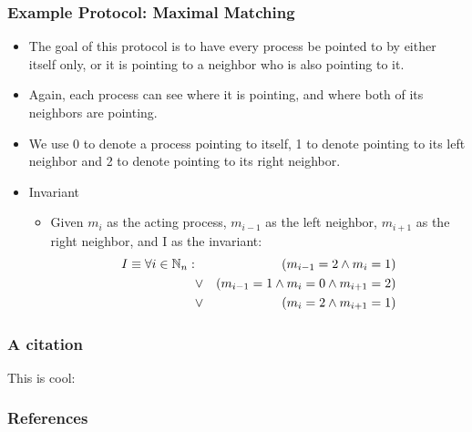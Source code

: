 \documentclass[handout]{beamer}
\begin{document}
\begin{frame}
\frametitle{Example Protocol: Maximal Matching}
\begin{itemize}
\item The goal of this protocol is to have every process be pointed to by either itself only, or it
    is pointing to a neighbor who is also pointing to it.
\item Again, each process can see where it is pointing, and where both of its neighbors are
    pointing.
\item We use 0 to denote a process pointing to itself, 1 to denote pointing to its left neighbor
    and 2 to denote pointing to its right neighbor.
\item Invariant
 \begin{itemize}
 \item Given $m_i$ as the acting process, $m_{i-1}$ as the left neighbor, $m_{i+1}$ as the right
    neighbor, and I as the invariant:
  \begin{eqnarray*}
   I \equiv \forall i\in\mathbb{N}_n: & & (m_{i-1} = 2 \wedge m_i = 1)
                    \\ & \vee  & (m_{i-1} = 1 \wedge m_i = 0 \wedge m_{i+1} = 2)
                    \\ & \vee  & (m_i = 2 \wedge m_{i+1} = 1)
  \end{eqnarray*}
 \end{itemize}
\end{itemize}
\end{frame}

\begin{frame}
\frametitle{A citation}
This is cool: \cite{sycraft2008}
\end{frame}

\begin{frame}[allowframebreaks]
\frametitle{References}


\end{frame}
\end{document}
